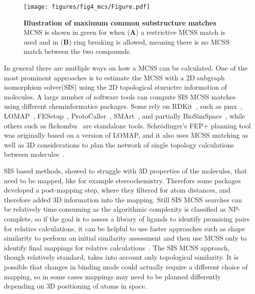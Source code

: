 \documentclass[9pt,bestpractices]{livecoms}
\begin{document}
\begin{figure}
    \texttt{[image: figures/fig4\_mcs/Figure.pdf]}
    \caption{\textbf{Illustration of maximum common substructure matches} MCSS is shown in green for when (\textbf{A}) a restrictive MCSS match is used and in (\textbf{B}) ring breaking is allowed, meaning there is no MCSS match between the two compounds.}
    \label{fig:fig_mcss}
\end{figure} 

In general there are mutliple ways on how a MCSS can be calculated. One of the most prominent approaches is to estimate the MCSS with a 2D subgraph isomorphism solver(SIS) using the 2D topological stuructre information of molecules\cite{raymond2002maximum}.
A large number of software tools can compute SIS MCSS matches using different cheminformatics packages. Some rely on RDKit~\cite{rdkit2019Dec}, such as pmx~\cite{gapsys2015pmx}, LOMAP~\cite{liu2013lead}, FESetup~\cite{loeffler2015fesetup}, ProtoCaller~\cite{suruzhon2020protocaller}, SMArt~\cite{petrov2021perturbation}, and partially BioSimSpace~\cite{hedges2019biosimspace}, while others such as fkckombu~\cite{kawabata20143d} are standalone tools. Schr\"{o}dinger's FEP+ planning tool was originally based on a version of LOMAP, and it also uses MCSS matching as well as 3D considerations to plan the network of single topology calculations between molecules~\cite{wang2015accurate}. 

SIS based methods, showed to struggle with 3D properties of the molecules, that need to be mapped, like for example stereochemistry. Therefore some packages developed a post-mapping step, where they filtered for atom distances, and therefore added 3D information into the mapping.
Still SIS MCSS searches can be relatively time consuming as the algorithmic complexity is classified as NP-complete, so if the goal is to assess a library of ligands to identify promising pairs for relative calculations, it can be helpful to use faster approaches such as shape similarity to perform an initial similarity assessment and then use MCSS only to identify final mappings for relative calculations~\cite{raymond2002maximum,klabunde2012mars,jones2009elucidating, Duesbury2018Comparison}. The SIS MCSS approach, though relatively standard, takes into account only topological similarity. It is possible that changes in binding mode could actually require a different choice of mapping, so in some cases mappings may need to be planned differently depending on 3D positioning of atoms in space. 
\end{document}
